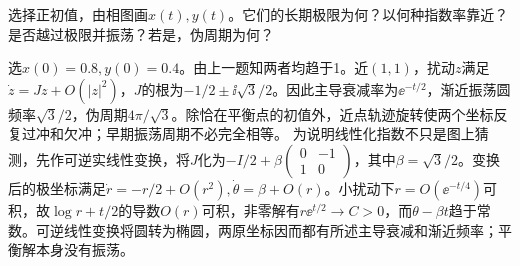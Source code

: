 \begin{exercise}\label{cw:rec25-4}
选择正初值，由相图画$x(t),y(t)$。它们的长期极限为何？以何种指数率靠近？是否越过极限并振荡？若是，伪周期为何？
\end{exercise}
\begin{solution}
选$x(0)=0.8,y(0)=0.4$。由上一题知两者均趋于1。近$(1,1)$，扰动$z$满足$\dot z=Jz+O(|z|^2)$，$J$的根为$-1/2\pm\ii\sqrt3/2$。因此主导衰减率为$\ee^{-t/2}$，渐近振荡圆频率$\sqrt3/2$，伪周期$4\pi/\sqrt3$。除恰在平衡点的初值外，近点轨迹旋转使两个坐标反复过冲和欠冲；早期振荡周期不必完全相等。
为说明线性化指数不只是图上猜测，先作可逆实线性变换，将$J$化为$-I/2+\beta\begin{pmatrix}0&-1\\1&0\end{pmatrix}$，其中$\beta=\sqrt3/2$。变换后的极坐标满足$\dot r=-r/2+O(r^2),\dot\theta=\beta+O(r)$。小扰动下$r=O(\ee^{-t/4})$可积，故$\log r+t/2$的导数$O(r)$可积，非零解有$r\ee^{t/2}\to C>0$，而$\theta-\beta t$趋于常数。可逆线性变换将圆转为椭圆，两原坐标因而都有所述主导衰减和渐近频率；平衡解本身没有振荡。

\end{solution}
